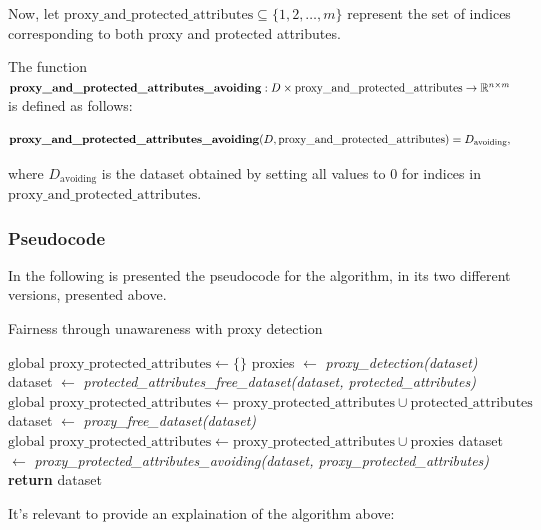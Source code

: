 Now, let $\text{proxy\_and\_protected\_attributes} \subseteq \{1, 2, \ldots, m\}$ represent the set of indices corresponding to both proxy and protected attributes.

The function $\text{\textbf{proxy\_and\_protected\_attributes\_avoiding}}: D \times \text{proxy\_and\_protected\_attributes} \rightarrow \mathbb{R}^{n \times m}$ is defined as follows:

\[
\text{\textbf{proxy\_and\_protected\_attributes\_avoiding}}(D, \text{proxy\_and\_protected\_attributes}) = D_{\text{avoiding}},
\]

where $D_{\text{avoiding}}$ is the dataset obtained by setting all values to 0 for indices in $\text{proxy\_and\_protected\_attributes}$.


\subsubsection{Pseudocode}

In the following is presented the pseudocode for the algorithm, in its two different versions, presented above.

\begin{algorithm}[H]
    \caption{Fairness through unawareness with proxy detection}
    \label{alg:fairness_algorithm}
    \begin{algorithmic}[1]
        \State $\text{global } \text{proxy\_protected\_attributes} \gets \{\}$
            \State proxies $\gets$ \textit{proxy\_detection(dataset)}\;
                \State dataset $\gets$ \textit{protected\_attributes\_free\_dataset(dataset, protected\_attributes)}\;
                \State $\text{global } \text{proxy\_protected\_attributes} \gets \text{proxy\_protected\_attributes} \cup \text{protected\_attributes}$ 
            \Else
                \State dataset $\gets$ \textit{proxy\_free\_dataset(dataset)}\;
                \State $\text{global } \text{proxy\_protected\_attributes} \gets \text{proxy\_protected\_attributes} \cup \text{proxies}$
            \EndIf
        \EndWhile
        \State dataset $\gets$ \textit{proxy\_protected\_attributes\_avoiding(dataset, proxy\_protected\_attributes)}
        \State \textbf{return} dataset
    \end{algorithmic}
\end{algorithm}

It's relevant to provide an explaination of the algorithm above:

